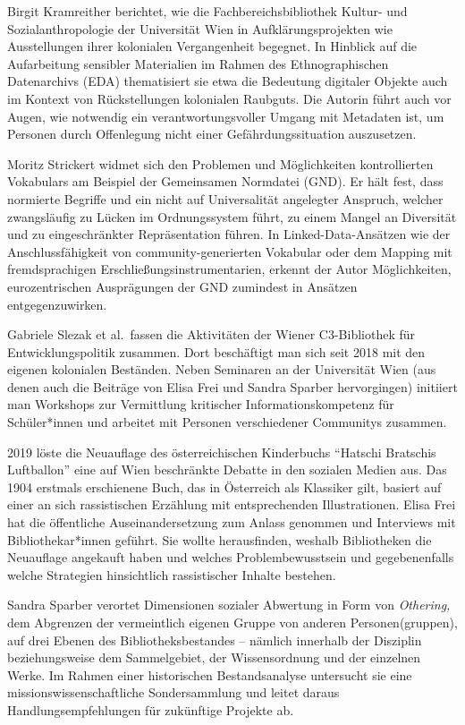 \documentclass[a4paper,
fontsize=11pt,
oneside,
numbers=noperiodatend,
parskip=half-,
bibliography=totoc,
final
]{scrartcl}
\begin{document}
Birgit Kramreither berichtet, wie die Fachbereichsbibliothek Kultur- und
Sozialanthropologie der Universität Wien in Aufklärungsprojekten wie
Ausstellungen ihrer kolonialen Vergangenheit begegnet. In Hinblick auf
die Aufarbeitung sensibler Materialien im Rahmen des Ethnographischen
Datenarchivs (EDA) thematisiert sie etwa die Bedeutung digitaler Objekte
auch im Kontext von Rückstellungen kolonialen Raubguts. Die Autorin
führt auch vor Augen, wie notwendig ein verantwortungsvoller Umgang mit
Metadaten ist, um Personen durch Offenlegung nicht einer
Gefährdungssituation auszusetzen.

Moritz Strickert widmet sich den Problemen und Möglichkeiten
kontrollierten Vokabulars am Beispiel der Gemeinsamen Normdatei (GND).
Er hält fest, dass normierte Begriffe und ein nicht auf Universalität
angelegter Anspruch, welcher zwangsläufig zu Lücken im Ordnungssystem
führt, zu einem Mangel an Diversität und zu eingeschränkter
Repräsentation führen. In Linked-Data-Ansätzen wie der
Anschlussfähigkeit von community-generierten Vokabular oder dem Mapping
mit fremdsprachigen Erschließungsinstrumentarien, erkennt der Autor
Möglichkeiten, eurozentrischen Ausprägungen der GND zumindest in
Ansätzen entgegenzuwirken.

Gabriele Slezak et al.~fassen die Aktivitäten der Wiener C3-Bibliothek
für Entwicklungspolitik zusammen. Dort beschäftigt man sich seit 2018
mit den eigenen kolonialen Beständen. Neben Seminaren an der Universität
Wien (aus denen auch die Beiträge von Elisa Frei und Sandra Sparber
hervorgingen) initiiert man Workshops zur Vermittlung kritischer
Informationskompetenz für Schüler*innen und arbeitet mit Personen
verschiedener Communitys zusammen.

2019 löste die Neuauflage des österreichischen Kinderbuchs
\enquote{Hatschi Bratschis Luftballon} eine auf Wien beschränkte Debatte
in den sozialen Medien aus. Das 1904 erstmals erschienene Buch, das in
Österreich als Klassiker gilt, basiert auf einer an sich rassistischen
Erzählung mit entsprechenden Illustrationen. Elisa Frei hat die
öffentliche Auseinandersetzung zum Anlass genommen und Interviews mit
Bibliothekar*innen geführt. Sie wollte herausfinden, weshalb
Bibliotheken die Neuauflage angekauft haben und welches
Problembewusstsein und gegebenenfalls welche Strategien hinsichtlich
rassistischer Inhalte bestehen.

Sandra Sparber verortet Dimensionen sozialer Abwertung in Form von
\emph{Othering,} dem Abgrenzen der vermeintlich eigenen Gruppe von
anderen Personen(gruppen), auf drei Ebenen des Bibliotheksbestandes --
nämlich innerhalb der Disziplin beziehungsweise dem Sammelgebiet, der
Wissensordnung und der einzelnen Werke. Im Rahmen einer historischen
Bestandsanalyse untersucht sie eine missionswissenschaftliche
Sondersammlung und leitet daraus Handlungsempfehlungen für zukünftige
Projekte ab.
\end{document}
